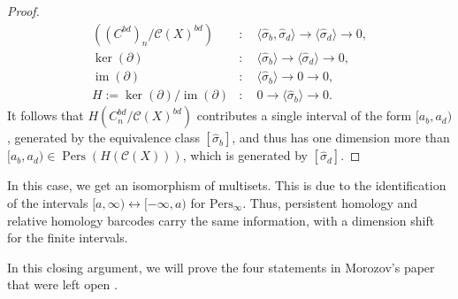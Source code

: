 \begin{proof}{\textit{\cite[Proof of Proposition 2.4]{de2011dualities}}}
\begin{align}
((C^{bd})_n/\mathcal{C}(X)^{bd}) &: \quad \langle \hat{\sigma}_b, \hat{\sigma}_d \rangle \rightarrow \langle \hat{\sigma}_d \rangle \rightarrow 0,\nonumber\\
\ker(\partial) &: \quad \langle \hat{\sigma}_b \rangle \rightarrow \langle \hat{\sigma}_d \rangle \rightarrow 0, \nonumber\\
\operatorname{im}(\partial) &: \quad \langle \hat{\sigma}_b \rangle \rightarrow 0 \rightarrow 0,\nonumber\\
H := \ker(\partial) / \operatorname{im}(\partial) &: \quad 0 \rightarrow \langle \hat{\sigma}_b \rangle \rightarrow 0.
\end{align}
It follows that $H(C^{bd}_n/\mathcal{C}(X)^{bd})$ contributes a single interval of the form $[a_b,a_d)$, generated by the equivalence class $[\hat{\sigma}_b]$, and thus has one dimension more than $[a_b,a_d) \in \operatorname{Pers}(H(\mathcal{C}(X)))$, which is generated by $[\hat{\sigma}_d]$.
\end{proof}

\begin{remark}{\cite[Proposition 2.4]{de2011dualities}}
	In this case, we get an isomorphism of multisets. This is due to the identification
	of the intervals $[a,\infty) \leftrightarrow [-\infty, a)$ for $\mathrm{Pers}_{\infty}$.
	Thus, persistent homology and relative homology barcodes carry the same information,
	with a dimension shift for the finite intervals.
\end{remark}

In this closing argument, we will prove the four statements in Morozov's paper that were left open \cite[\S 2.8]{de2011dualities}.

